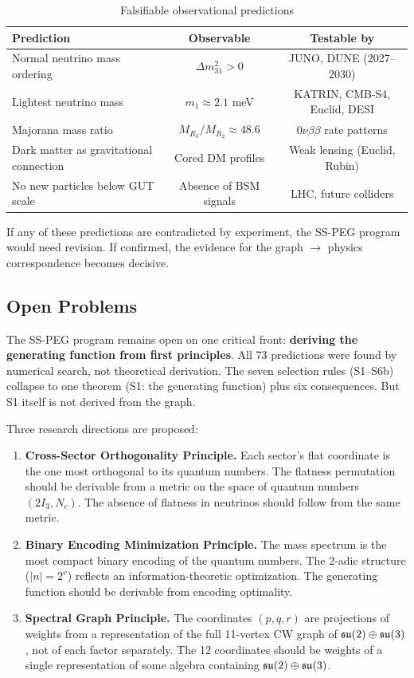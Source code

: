 \begin{table}[h]
\centering
\caption{Falsifiable observational predictions}
\label{tab:predictions}
\begin{tabular}{lcc}
\hline\hline
Prediction & Observable & Testable by \\
\hline
Normal neutrino mass ordering & $\Delta m^2_{31} > 0$ & JUNO, DUNE (2027--2030) \\
Lightest neutrino mass & $m_1 \approx 2.1$ meV & KATRIN, CMB-S4, Euclid, DESI \\
Majorana mass ratio & $M_{R_3}/M_{R_2} \approx 48.6$ & $0\nu\beta\beta$ rate patterns \\
Dark matter as gravitational connection & Cored DM profiles & Weak lensing (Euclid, Rubin) \\
No new particles below GUT scale & Absence of BSM signals & LHC, future colliders \\
\hline\hline
\end{tabular}
\end{table}

If any of these predictions are contradicted by experiment, the SS-PEG program would need revision. If confirmed, the evidence for the graph $\to$ physics correspondence becomes decisive.

\subsection{Open Problems}\label{sec:open_problems}

The SS-PEG program remains open on one critical front: \textbf{deriving the generating function from first principles}. All 73 predictions were found by numerical search, not theoretical derivation. The seven selection rules (S1--S6b) collapse to one theorem (S1: the generating function) plus six consequences. But S1 itself is not derived from the graph.

Three research directions are proposed:

\begin{enumerate}
\item \textbf{Cross-Sector Orthogonality Principle.} Each sector's flat coordinate is the one most orthogonal to its quantum numbers. The flatness permutation should be derivable from a metric on the space of quantum numbers $(2I_3, N_c)$. The absence of flatness in neutrinos should follow from the same metric.

\item \textbf{Binary Encoding Minimization Principle.} The mass spectrum is the most compact binary encoding of the quantum numbers. The 2-adic structure ($|n| = 2^v$) reflects an information-theoretic optimization. The generating function should be derivable from encoding optimality.

\item \textbf{Spectral Graph Principle.} The coordinates $(p, q, r)$ are projections of weights from a representation of the full 11-vertex CW graph of $\mathfrak{su}(2) \oplus \mathfrak{su}(3)$, not of each factor separately. The 12 coordinates should be weights of a single representation of some algebra containing $\mathfrak{su}(2) \oplus \mathfrak{su}(3)$.
\end{enumerate}

